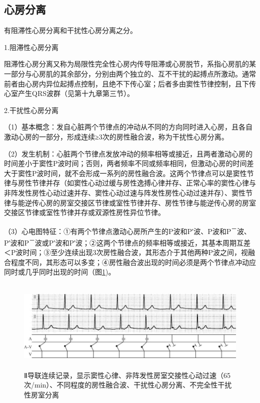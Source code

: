 \subsection{心房分离}

有阻滞性心房分离和干扰性心房分离之分。

1.阻滞性心房分离

阻滞性心房分离又称为局限性完全性心房内传导阻滞或心房脱节，系指心房肌的某一部分与心房肌的其余部分，分别由两个独立的、互不干扰的起搏点所激动。通常前者由心房内异位起搏点控制，且绝不下传心室；后者多由窦性节律控制，且下传心室产生QRS波群（见第十九章第三节）。

2.干扰性心房分离

（1）基本概念：发自心脏两个节律点的冲动从不同的方向同时进入心房，且各自激动心房的一部分，形成连续≥3次的房性融合波，称为干扰性心房分离。

（2）发生机制：心脏两个节律点发放冲动的频率相等或接近，且两者激动心房的时间差小于窦性P波时间；否则，两者频率不同或频率相同，但激动心房的时间差大于窦性P波时间，就不会形成一系列的房性融合波。这两个节律点可以是窦性节律与房性节律并存（如窦性心动过缓与房性逸搏心律并存、正常心率的窦性心律与非阵发性房性心动过速并存、窦性心动过速与阵发性房性心动过速并存）、窦性节律与能逆传心房的房室交接区节律或室性节律并存、房性节律与能逆传心房的房室交接区节律或室性节律并存或双源性房性异位节律。

（3）心电图特征：①有两个节律点激动心房所产生的P波和P′波、P波和P\textsuperscript{－}波、P′波和P\textsuperscript{－}波或P′波和P′波；②这两个节律点的频率相等或接近，其基本周期互差＜P波时间；③至少连续出现3次房性融合波，其形态介于其他两种P波之间，视融合程度不同，其形态可以多变；④房性融合波出现的时间必须是两个节律点冲动应同时或几乎同时出现的时间（图\ref{fig30-2})。

\begin{figure}[!htbp]
 \centering
 \includegraphics[width=5.80208in,height=1.75in]{./images/Image00497.jpg}
 \captionsetup{justification=centering}
 \caption{Ⅱ导联连续记录，显示窦性心律、非阵发性房室交接性心动过速（65次/min）、不同程度的房性融合波、干扰性心房分离、不完全性干扰性房室分离}
 \label{fig30-2}
  \end{figure} 

